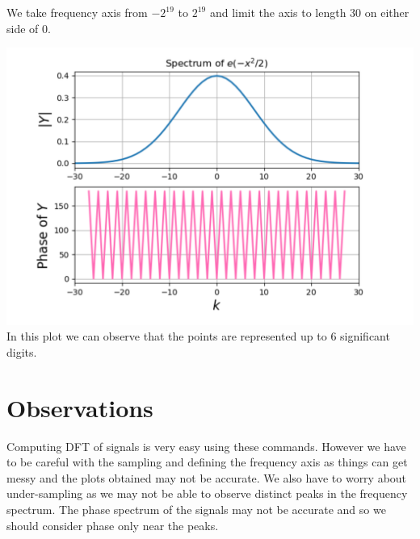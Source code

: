 \documentclass[10pt,english, openany]{book}
\begin{document}
We take frequency axis from $-2^{19}$ to $ 2^{19}$ and limit the axis to length 30 on either side of 0.

{\centering \includegraphics[scale=0.3]{Figure4.png}}\\

In this plot we can observe that the points are represented up to 6 significant digits.

\section{Observations}
Computing DFT of signals is very easy using these commands. However we have to be careful with the sampling and defining the frequency axis as things can get messy and the plots obtained may not be accurate. We also have to worry about under-sampling as we may not be able to observe distinct peaks in the frequency spectrum. The phase spectrum of the signals may not be accurate and so we should consider phase only near the peaks.
\end{document}
